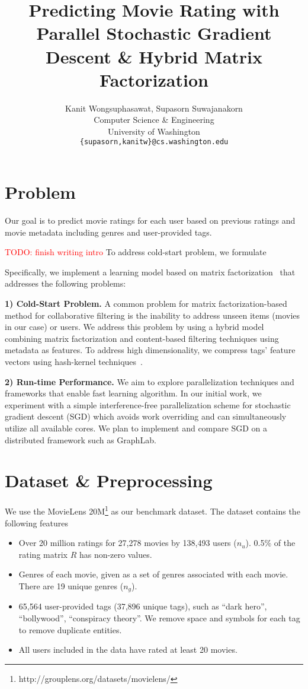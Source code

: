 \documentclass{article} %
\title{Predicting Movie Rating with Parallel Stochastic Gradient Descent \& Hybrid Matrix Factorization}
\author{
	Kanit Wongsuphasawat, Supasorn Suwajanakorn \\
	Computer Science \& Engineering\\
	University of Washington\\
	\texttt{\{supasorn,kanitw\}@cs.washington.edu} \\
}
\newcommand{\todo}[1]{\textcolor{red}{TODO: #1}}
\begin{document}
\maketitle

\section{Problem}

	Our goal is to predict movie ratings for each user based on previous ratings
	and movie metadata including genres and user-provided tags.

	\todo{finish writing intro}
	To address cold-start problem, we formulate


	Specifically, we implement a learning model based on matrix
	factorization~\cite{koren:matrix} that addresses the following problems:

	\textbf{1) Cold-Start Problem.}
	A common problem for matrix factorization-based method for collaborative
	filtering is the inability to address unseen items (movies in our case) or
	users.  We address this problem by using a hybrid model combining matrix
	factorization and content-based filtering techniques using metadata as
	features. To address high dimensionality, we compress tags' feature vectors
	using hash-kernel techniques~\cite{shi:hashkernels}.

	\textbf{2) Run-time Performance.}
	We aim to explore parallelization techniques and frameworks that enable fast
	learning algorithm.  In our initial work, we experiment with a simple
	interference-free parallelization scheme for stochastic gradient descent
	(SGD) which avoids work overriding and can simultaneously utilize all
	available cores. We plan to implement and compare SGD on a distributed
	framework such as GraphLab.


\section{Dataset \& Preprocessing}

	We use the MovieLens 20M\footnote{http://grouplens.org/datasets/movielens/}
	as our benchmark dataset.  The dataset contains the following features

	\begin{itemize}
		\item Over 20 million ratings for 27,278 movies by 138,493 users ($n_u$).
		0.5\% of the rating matrix $R$ has non-zero values.
		\item Genres of each movie, given as a set of genres associated with each
	movie. There are 19 unique genres ($n_g$).
		\item 65,564 user-provided tags (37,896 unique tags), such as ``dark hero'', ``bollywood'',
		``conspiracy theory''.  We remove space and symbols for each tag to remove duplicate entities.
		\item All users included in the data have rated at least 20 movies.
	\end{itemize}
\end{document}
